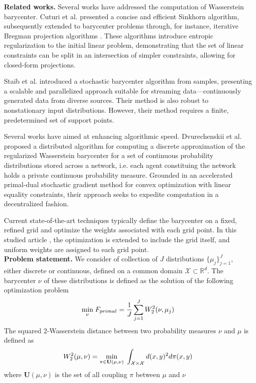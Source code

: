 \textbf{Related works.}  Several works have addressed the computation of Wasserstein barycenter. Cuturi et al. \cite{cuturi_sinkhorn_2013} presented a concise and efficient Sinkhorn algorithm, subsequently extended to barycenter problems through, for instance, iterative Bregman projection algorithms \cite{benamou_iterative_2014}. These algorithms introduce entropic regularization to the initial linear problem, demonstrating that the set of linear constraints can be split in an intersection of simpler constraints, allowing for closed-form projections.

Staib et al. \cite{staib_parallel_2017} introduced a stochastic barycenter algorithm from samples, presenting a scalable and parallelized approach suitable for streaming data—continuously generated data from diverse sources. Their method is also robust to nonstationary input distributions. However, their method requires a finite, predetermined set of support points. 

Several works have aimed at enhancing algorithmic speed. Dvurechenskii et al. \cite{dvurechenskii_decentralize_2018} proposed a distributed algorithm for computing a discrete approximation of the regularized Wasserstein barycenter for a set of continuous probability distributions stored across a network, i.e. each agent constituing the network holds a private continuous probability measure. Grounded in an accelerated primal-dual stochastic gradient method for convex optimization with linear equality constraints, their approach seeks to expedite computation in a decentralized fashion.

Current state-of-the-art techniques typically define the barycenter on a fixed, refined grid and optimize the weights associated with each grid point. In this studied article \cite{claici_stochastic_2018}, the optimization is extended to include the grid itself, and uniform weights are assigned to each grid point. \\ 

\textbf{Problem statement.} We consider of collection of $J$ distributions $\lbrace \mu_j \rbrace_{j=1}^J$, either discrete or continuous, defined on a common domain $\mathcal{X} \subset \mathbb{R}^d$. The barycenter $\nu$ of these distributions is defined as the solution of the following optimization problem 
\begin{equation}\label{eq:primal}
      \underset{\nu}{\min}\; F_{primal} = \frac{1}{J}\sum_{j=1}^{J} W_2^2(\nu, \mu_j)
\end{equation}
The squared 2-Wasserstein distance between two probability measures $\nu$ and $\mu$ is defined as
\begin{equation}\label{eq:W2}
     W_2^2(\mu, \nu) = \underset{\pi \in \textbf{U}(\mu, \nu)}{\min}\; \int_{\mathcal{X}\times\mathcal{X}} d(x, y)^2 d\pi(x, y)
\end{equation}
where $\textbf{U}(\mu, \nu)$ is the set of all coupling $\pi$ between $\mu$ and $\nu$

